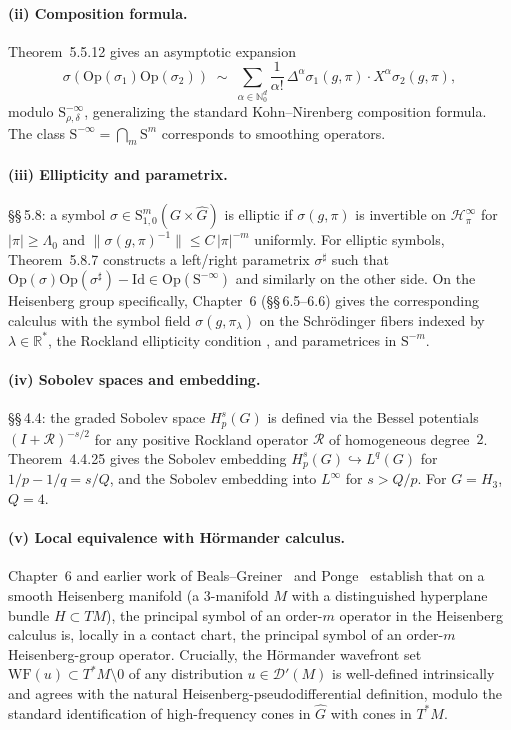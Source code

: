 \documentclass[11pt, a4paper]{article}
\newcommand{\RR}{\mathbb{R}}
\newcommand{\NN}{\mathbb{N}}
\newcommand{\Hgroup}{H_3}
\newcommand{\WF}{\mathrm{WF}}
\newcommand{\Lam}{\Lambda}
\newcommand{\Op}{\mathrm{Op}}
\newcommand{\Sym}{\mathrm{S}}
\begin{document}
\paragraph{(ii) Composition formula.}
\cite{FR16} Theorem~5.5.12 gives an asymptotic expansion
\begin{equation}\label{eq:composition}
  \sigma(\Op(\sigma_1)\Op(\sigma_2))
  \;\sim\;\sum_{\alpha\in\NN_0^d}\frac{1}{\alpha!}\,
  \Delta^\alpha\sigma_1(g,\pi)\cdot X^\alpha\sigma_2(g,\pi),
\end{equation}
modulo $\Sym^{-\infty}_{\rho,\delta}$, generalizing the standard Kohn--Nirenberg
composition formula. The class $\Sym^{-\infty}=\bigcap_m \Sym^m$ corresponds
to smoothing operators.

\paragraph{(iii) Ellipticity and parametrix.}
\cite{FR16} \S\S\,5.8: a symbol $\sigma\in\Sym^m_{1,0}(G\times\widehat G)$ is
elliptic if $\sigma(g,\pi)$ is invertible on $\mathcal H_\pi^\infty$ for
$|\pi|\ge\Lam_0$ and $\|\sigma(g,\pi)^{-1}\|\le C\,|\pi|^{-m}$ uniformly. For
elliptic symbols, Theorem~5.8.7 constructs a left/right parametrix
$\sigma^\sharp$ such that $\Op(\sigma)\Op(\sigma^\sharp)-\mathrm{Id}\in
\Op(\Sym^{-\infty})$ and similarly on the other side. On the Heisenberg
group specifically, Chapter~6 (\S\S\,6.5--6.6) gives the corresponding
calculus with the symbol field $\sigma(g,\pi_\lambda)$ on the Schrödinger
fibers indexed by $\lambda\in\RR^*$, the Rockland ellipticity condition
\cite[\S6.6.1]{FR16}, and parametrices in $\Sym^{-m}$.

\paragraph{(iv) Sobolev spaces and embedding.}
\cite{FR16} \S\S\,4.4: the graded Sobolev space $H^s_p(G)$ is defined via the
Bessel potentials $(I+\mathcal R)^{-s/2}$ for any positive Rockland operator
$\mathcal R$ of homogeneous degree~$2$. Theorem~4.4.25 gives the Sobolev
embedding $H^s_p(G)\hookrightarrow L^q(G)$ for $1/p-1/q=s/Q$, and the
Sobolev embedding into $L^\infty$ for $s>Q/p$. For $G=\Hgroup$, $Q=4$.

\paragraph{(v) Local equivalence with Hörmander calculus.}
\cite{FR16} Chapter~6 and earlier work of Beals--Greiner~\cite{BG88} and
Ponge~\cite{Pon08} establish that on a smooth Heisenberg manifold (a
$3$-manifold $M$ with a distinguished hyperplane bundle $H\subset TM$),
the principal symbol of an order-$m$ operator in the Heisenberg
calculus is, locally in a contact chart, the principal symbol of an
order-$m$ Heisenberg-group operator. Crucially, the Hörmander wavefront
set $\WF(u)\subset T^*M\setminus 0$ of any distribution $u\in\mathcal D'(M)$
is well-defined intrinsically and agrees with the natural
Heisenberg-pseudodifferential definition, modulo the standard
identification of high-frequency cones in $\widehat G$ with cones in $T^*M$.
\end{document}
